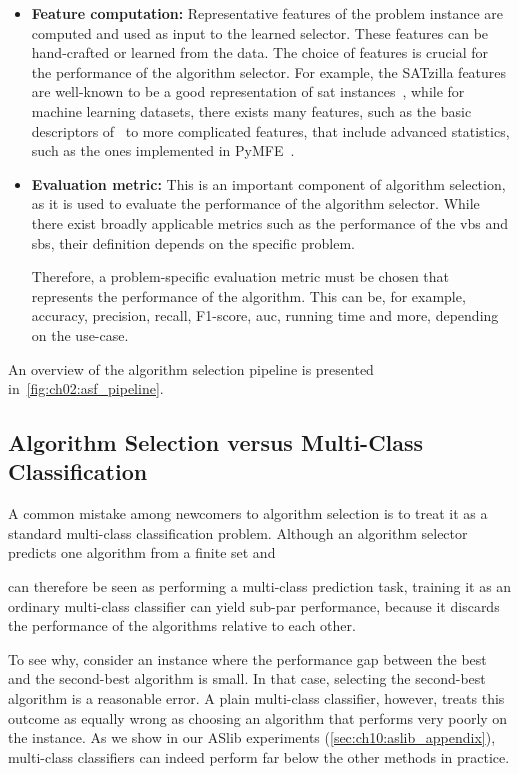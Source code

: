 \begin{itemize}
    \item \textbf{Feature computation:} Representative features of the problem instance are computed and used as input to the learned selector. These features can be hand-crafted or learned from the data. The choice of features is crucial for the performance of the algorithm selector. For example, the SATzilla features are well-known to be a good representation of \gls{sat} instances~\citep{HutEtAl14,ShaHoo24}, while for machine learning datasets, there exists many features, such as the basic descriptors of~\citet{OztEtAl22} to more complicated features, that include advanced statistics, such as the ones implemented in PyMFE~\citep{AlcEtAl20}.

    \item \textbf{Evaluation metric:} This is an important component of algorithm selection, as it is used to evaluate the performance of the algorithm selector. While there exist broadly applicable metrics such as the performance of the \gls{vbs} and \gls{sbs}, their definition depends on the specific problem.

    Therefore, a problem-specific evaluation metric must be chosen that represents the performance of the algorithm. This can be, for example, accuracy, precision, recall, F1-score, \gls{auc}, running time and more, depending on the use-case.
\end{itemize}
An overview of the algorithm selection pipeline is presented in~\cref{fig:ch02:asf_pipeline}.

\subsection{Algorithm Selection versus Multi-Class Classification}
A common mistake among newcomers to algorithm selection is to treat it as a standard multi-class classification problem.
Although an algorithm selector predicts one algorithm from a finite set and

can therefore be seen as performing a multi-class prediction task, training it as an ordinary multi-class classifier can yield sub-par performance, because it discards the performance of the algorithms relative to each other.

To see why, consider an instance where the performance gap between the best and the second-best algorithm is small.
In that case, selecting the second-best algorithm is a reasonable error.
A plain multi-class classifier, however, treats this outcome as equally wrong as choosing an algorithm that performs very poorly on the instance.
As we show in our ASlib experiments (\cref{sec:ch10:aslib_appendix}), multi-class classifiers can indeed perform far below the other methods in practice.


